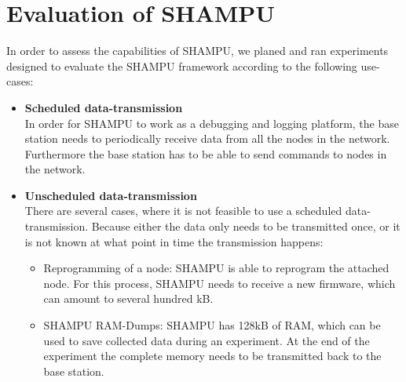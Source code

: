 
\chapter{Evaluation of SHAMPU}
In order to assess the capabilities of SHAMPU, we planed and ran experiments designed to evaluate the SHAMPU framework according to the following use-cases:
\begin{itemize}
	\item{\textbf{Scheduled data-transmission}} \hfill \\ In order for SHAMPU to work as a debugging and logging platform, the base station needs to periodically receive data from all the nodes in the network. Furthermore the base station has to be able to send commands to nodes in the network.
	
	\item{\textbf{Unscheduled data-transmission}} \hfill \\ There are several cases, where it is not feasible to use a scheduled data-transmission. Because either the data only needs to be transmitted once, or it is not known at what point in time the transmission happens: 
	\begin{itemize}
		\item{}Reprogramming of a node: SHAMPU is able to reprogram the attached node. For this process, SHAMPU needs to receive a new firmware, which can amount to several hundred kB.
		\item{}SHAMPU RAM-Dumps: SHAMPU has 128kB of RAM, which can be used to save collected data during an experiment. At the end of the experiment the complete memory needs to be transmitted back to the base station.
	\end{itemize}
\end{itemize}
	
